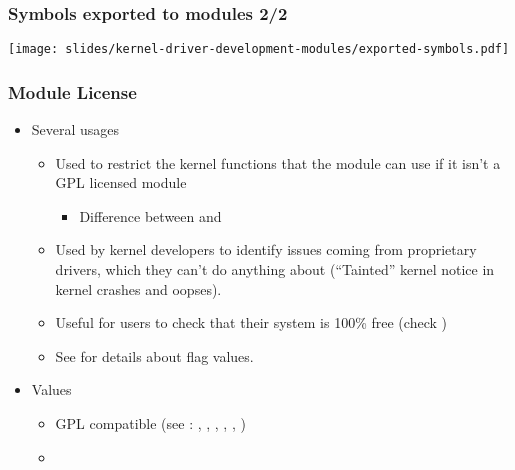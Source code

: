 \begin{frame}
  \frametitle{Symbols exported to modules 2/2}
  \begin{center}
    \texttt{[image: slides/kernel-driver-development-modules/exported-symbols.pdf]}
  \end{center}
\end{frame}

\begin{frame}
  \frametitle{Module License}
  \begin{itemize}
  \item Several usages
    \begin{itemize}
    \item Used to restrict the kernel functions that the module can
      use if it isn't a GPL licensed module
      \begin{itemize}
      \item Difference between  and
      \end{itemize}
    \item Used by kernel developers to identify issues coming from
      proprietary drivers, which they can't do anything about
      (“Tainted” kernel notice in kernel crashes and oopses).
    \item Useful for users to check that their system is 100\% free
      (check )
    \item See 
      for details about  flag values.
    \end{itemize}
  \item Values
    \begin{itemize}
    \item GPL compatible (see :
      , , ,
      , , )
    \item {}
    \end{itemize}
  \end{itemize}
\end{frame}

